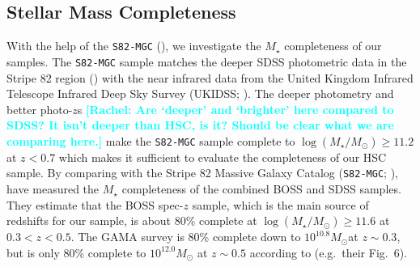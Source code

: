 \documentclass[a4paper,fleqn,usenatbib]{mnras}
\def\msun{$M_\odot$}
\def\etal{{\ et al.~}}
\def\ser{{S\'{e}rsic\ }}
\def\mstar{{$M_{\star}$}}
\def\logms{{$\log (M_{\star}/M_{\odot})$}}
\def\m2l{{$M_{\star}/L_{\star}$}}
\newcommand{\rachel}[1]{\textcolor{cyan}{\textbf{[Rachel: #1]}}}
\begin{document}
    
        
   

\subsection{Stellar Mass Completeness}
    \label{ssec:complete}
    
    With the help of the \texttt{S82-MGC} (\citealt{Bundy2015}), we investigate the 
    \mstar{} completeness of our samples. 
    The \texttt{S82-MGC} sample matches the deeper SDSS photometric data in the 
    Stripe 82 region (\citealt{Annis2014}) with the near infrared data from the United 
    Kingdom Infrared Telescope Infrared Deep Sky Survey (UKIDSS; 
    \citealt{Lawrence2007}). 
    The deeper photometry and better photo-$z$s \rachel{Are `deeper' and `brighter' here compared to SDSS?  It isn't deeper than HSC, is it?  Should be clear what we are comparing here.} make the \texttt{S82-MGC} sample 
    complete to \logms{}$\geq 11.2$ at $z<0.7$ which makes it sufficient to evaluate 
    the completeness of our HSC sample.   
	By comparing with the Stripe 82 Massive Galaxy Catalog
    (\texttt{S82-MGC}; \citealt{Bundy2015}), \citet{Leauthaud2016} have measured the
    \mstar{} completeness of the combined BOSS and SDSS samples. 
    They estimate that the BOSS spec-$z$ sample, which is the main source of redshifts for our sample, is about 80\% complete at 
    \logms{}$\geq 11.6$ at $0.3 < z < 0.5$. The GAMA survey is 80\% complete down to 
    $10^{10.8}$\msun at $z{\sim} 0.3$, but is only 80\% complete to 
    $10^{12.0}$\msun{} at $z{\sim} 0.5$ according to \citet{Taylor2011} (e.g.\ 
    their Fig.~6).
    
\end{document}
